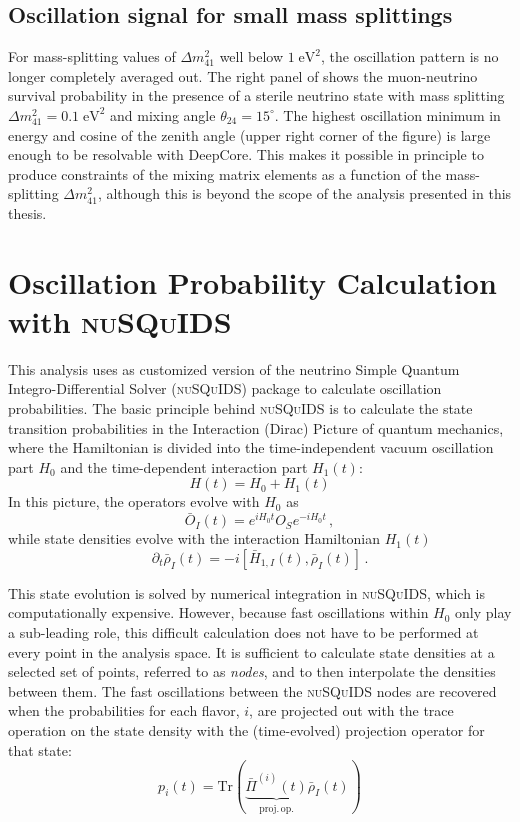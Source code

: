 \subsection{Oscillation signal for small mass splittings}
For mass-splitting values of $\Delta m^2_{41}$ well below $1\;\mathrm{eV^2}$, the oscillation pattern is no longer completely averaged out. The right panel of  shows the muon-neutrino survival probability in the presence of a sterile neutrino state with mass splitting $\Delta m^2_{41}=0.1\;\mathrm{eV^2}$ and mixing angle $\theta_{24}=15^\circ$. The highest oscillation minimum in energy and cosine of the zenith angle (upper right corner of the figure) is large enough to be resolvable with DeepCore. This makes it possible in principle to produce constraints of the mixing matrix elements as a function of the mass-splitting $\Delta m^2_{41}$, although this is beyond the scope of the analysis presented in this thesis.

\section{Oscillation Probability Calculation with \textsc{nuSQuIDS}}
\label{sec:nusquids}

This analysis uses as customized version of the neutrino Simple Quantum Integro-Differential Solver (\textsc{nuSQuIDS})\cite{squids, nusquids} package to calculate oscillation probabilities. The basic principle behind \textsc{nuSQuIDS} is to calculate the state transition probabilities in the Interaction (Dirac) Picture of quantum mechanics, where the Hamiltonian is divided into the time-independent vacuum oscillation part $H_0$ and the time-dependent interaction part $ H_1(t)$:
$$ H(t) = H_0 + H_1(t)$$
In this picture, the operators evolve with $ H_0$ as
$$
\bar{O}_I(t)=e^{iH_0t}O_Se^{-iH_0t}\,,
$$
while state densities evolve with the interaction Hamiltonian $ H_1(t)$
$$
\partial_t\bar{\rho}_I(t)=-i[\bar{H}_{1, I}(t), \bar{\rho}_I(t)]\,.
$$

This state evolution is solved by numerical integration in \textsc{nuSQuIDS}, which is computationally expensive. However, because fast oscillations within $ H_0$ only play a sub-leading role, this difficult calculation does not have to be performed at every point in the analysis space. It is sufficient to calculate state densities at a selected set of points, referred to as \emph{nodes}, and to then interpolate the densities between them. The fast oscillations between the \textsc{nuSQuIDS} nodes are recovered when the probabilities for each flavor, $i$, are projected out with the trace operation on the state density with the (time-evolved) projection operator for that state:
$$
p_i(t)=\mathrm{Tr}(\underbrace{\bar{\Pi}^{(i)}(t)}_{\mathrm{proj.\,op.}}\bar{\rho}_I(t))
$$

